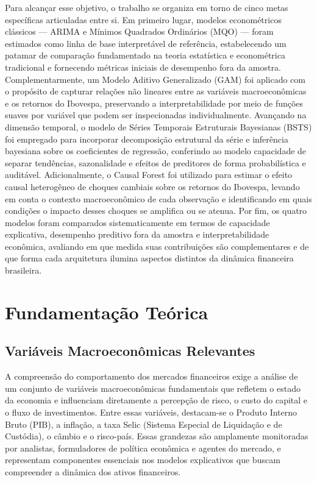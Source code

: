 \documentclass[	12pt, Times, openright, oneside, a4paper, english, brazil]{abntex2}
\begin{document}
Para alcançar esse objetivo, o trabalho se organiza em torno de cinco metas específicas articuladas entre si. Em primeiro lugar, modelos econométricos clássicos — ARIMA e Mínimos Quadrados Ordinários (MQO) — foram estimados como linha de base interpretável de referência, estabelecendo um patamar de comparação fundamentado na teoria estatística e econométrica tradicional e fornecendo métricas iniciais de desempenho fora da amostra. Complementarmente, um Modelo Aditivo Generalizado (GAM) foi aplicado com o propósito de capturar relações não lineares entre as variáveis macroeconômicas e os retornos do Ibovespa, preservando a interpretabilidade por meio de funções suaves por variável que podem ser inspecionadas individualmente. Avançando na dimensão temporal, o modelo de Séries Temporais Estruturais Bayesianas (BSTS) foi empregado para incorporar decomposição estrutural da série e inferência bayesiana sobre os coeficientes de regressão, conferindo ao modelo capacidade de separar tendências, sazonalidade e efeitos de preditores de forma probabilística e auditável. Adicionalmente, o Causal Forest foi utilizado para estimar o efeito causal heterogêneo de choques cambiais sobre os retornos do Ibovespa, levando em conta o contexto macroeconômico de cada observação e identificando em quais condições o impacto desses choques se amplifica ou se atenua. Por fim, os quatro modelos foram comparados sistematicamente em termos de capacidade explicativa, desempenho preditivo fora da amostra e interpretabilidade econômica, avaliando em que medida suas contribuições são complementares e de que forma cada arquitetura ilumina aspectos distintos da dinâmica financeira brasileira.

\chapter{Fundamentação Teórica}

\section{Variáveis Macroeconômicas Relevantes}

A compreensão do comportamento dos mercados financeiros exige a análise de um conjunto de variáveis macroeconômicas fundamentais que refletem o estado da economia e influenciam diretamente a percepção de risco, o custo do capital e o fluxo de investimentos. Entre essas variáveis, destacam-se o Produto Interno Bruto (PIB), a inflação, a taxa Selic (Sistema Especial de Liquidação e de Custódia), o câmbio e o risco-país. Essas grandezas são amplamente monitoradas por analistas, formuladores de política econômica e agentes do mercado, e representam componentes essenciais nos modelos explicativos que buscam compreender a dinâmica dos ativos financeiros.
\end{document}
